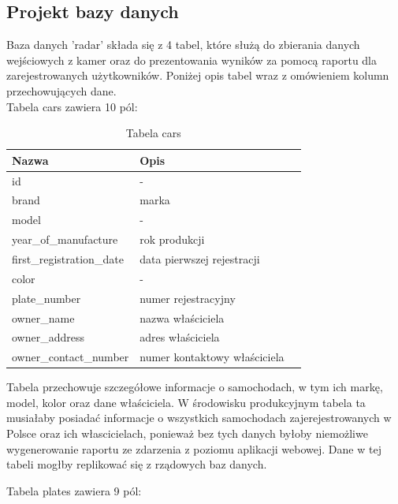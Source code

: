 \documentclass[12pt,a4paper,oneside]{article}
\theoremstyle{definition}
\numberwithin{equation}{section}
\begin{document}
        \newpage
\subsection{Projekt bazy danych}
Baza danych 'radar' składa się z 4 tabel, które służą do zbierania danych wejściowych z kamer oraz do prezentowania wyników za pomocą raportu dla zarejestrowanych użytkowników. Poniżej opis tabel wraz z omówieniem kolumn przechowujących dane.\\

    Tabela cars zawiera 10 pól:
    \begin{table}[h]
    \centering
    \begin{tabularx}{\textwidth}{|X|X|X|}
    \hline
    \textbf{Nazwa} & \textbf{Opis} \\ \hline
    id &  -   \\ \hline
    brand & marka \\  \hline
    model & - \\  \hline
    year{\_}of{\_}manufacture & rok produkcji \\  \hline
    first{\_}registration{\_}date & data pierwszej rejestracji \\  \hline
    color & - \\  \hline
    plate{\_}number & numer rejestracyjny \\ \hline
    owner{\_}name & nazwa właściciela \\ \hline
    owner{\_}address & adres właściciela \\ \hline
    owner{\_}contact{\_}number & numer kontaktowy właściciela\\ \hline
    \end{tabularx}
    \caption{Tabela cars}
    \end{table}
        
        Tabela przechowuje szczegółowe informacje o samochodach, w tym ich markę, model, kolor oraz dane właściciela. W środowisku produkcyjnym tabela ta musiałaby posiadać informacje o wszystkich samochodach zajerejestrowanych w Polsce oraz ich włascicielach, ponieważ bez tych danych byłoby niemożliwe wygenerowanie raportu ze zdarzenia z poziomu aplikacji webowej. Dane w tej tabeli mogłby replikować się z rządowych baz danych.  

    \newpage
    Tabela plates zawiera 9 pól:
\end{document}
